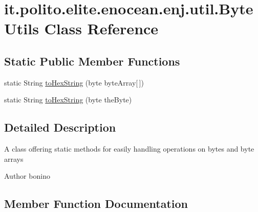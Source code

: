 \hypertarget{classit_1_1polito_1_1elite_1_1enocean_1_1enj_1_1util_1_1_byte_utils}{}\section{it.\+polito.\+elite.\+enocean.\+enj.\+util.\+Byte\+Utils Class Reference}
\label{classit_1_1polito_1_1elite_1_1enocean_1_1enj_1_1util_1_1_byte_utils}
\subsection*{Static Public Member Functions}
\begin{DoxyCompactItemize}
\item 
static String \hyperlink{classit_1_1polito_1_1elite_1_1enocean_1_1enj_1_1util_1_1_byte_utils_a23f4cbd3b897e43f0145e848c6202756}{to\+Hex\+String} (byte byte\+Array\mbox{[}$\,$\mbox{]})
\item 
static String \hyperlink{classit_1_1polito_1_1elite_1_1enocean_1_1enj_1_1util_1_1_byte_utils_aadd9b46fcbd1b96c67d0724d7aaa614c}{to\+Hex\+String} (byte the\+Byte)
\end{DoxyCompactItemize}


\subsection{Detailed Description}
A class offering static methods for easily handling operations on bytes and byte arrays

\begin{DoxyAuthor}{Author}
bonino 
\end{DoxyAuthor}


\subsection{Member Function Documentation}
\hypertarget{classit_1_1polito_1_1elite_1_1enocean_1_1enj_1_1util_1_1_byte_utils_a23f4cbd3b897e43f0145e848c6202756}{}\label{classit_1_1polito_1_1elite_1_1enocean_1_1enj_1_1util_1_1_byte_utils_a23f4cbd3b897e43f0145e848c6202756} 
